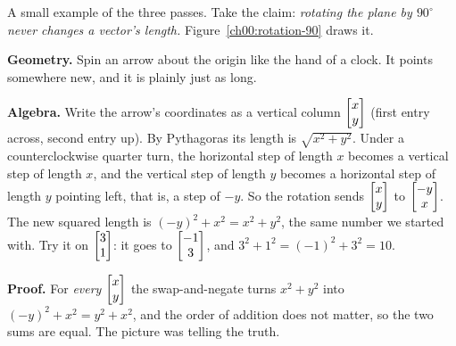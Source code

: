 \begin{intuitionbox}
A small example of the three passes. Take the claim: \emph{rotating the plane by
$90^\circ$ never changes a vector's length.} Figure~\ref{ch00:rotation-90} draws it.

\textbf{Geometry.} Spin an arrow about the origin like the hand of a clock. It
points somewhere new, and it is plainly just as long.

\textbf{Algebra.} Write the arrow's coordinates as a vertical column $\begin{bmatrix}x \\ y\end{bmatrix}$
(first entry across, second entry up). By Pythagoras its length is $\sqrt{x^2+y^2}$.
Under a counterclockwise quarter turn, the horizontal step of length $x$ becomes a
vertical step of length $x$, and the vertical step of length $y$ becomes a
horizontal step of length $y$ pointing left, that is, a step of $-y$. So the
rotation sends $\begin{bmatrix}x \\ y\end{bmatrix}$ to $\begin{bmatrix}-y \\ x\end{bmatrix}$. The new squared length is
$(-y)^2 + x^2 = x^2 + y^2$, the same number we started with. Try it on
$\begin{bmatrix}3 \\ 1\end{bmatrix}$: it goes to $\begin{bmatrix}-1 \\ 3\end{bmatrix}$, and $3^2 + 1^2 = (-1)^2 + 3^2 = 10$.

\textbf{Proof.} For \emph{every} $\begin{bmatrix}x \\ y\end{bmatrix}$ the swap-and-negate turns
$x^2 + y^2$ into $(-y)^2 + x^2 = y^2 + x^2$, and the order of addition does not
matter, so the two sums are equal. The picture was telling the truth.
\end{intuitionbox}


